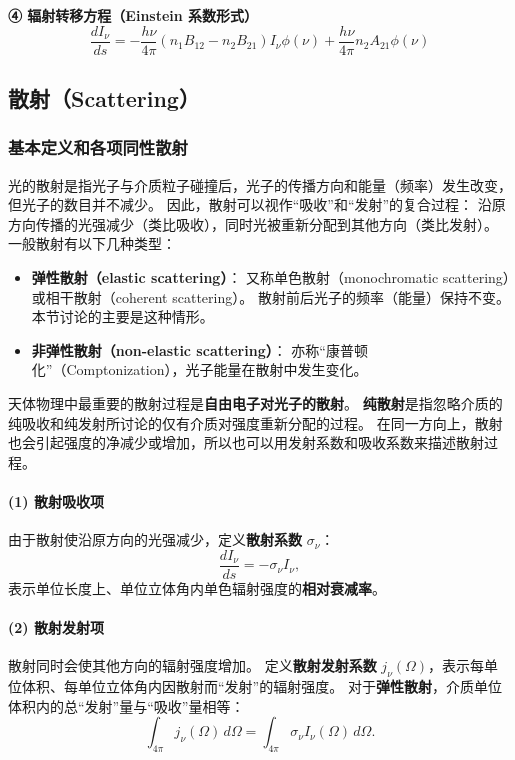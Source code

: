 \vspace{0.5em}
\noindent\textbf{④ 辐射转移方程（Einstein 系数形式）}
\[
\boxed{
\frac{dI_\nu}{ds}
= -\frac{h\nu}{4\pi}(n_1 B_{12} - n_2 B_{21}) I_\nu \phi(\nu)
+ \frac{h\nu}{4\pi} n_2 A_{21} \phi(\nu)
}
\]

\subsection{散射（Scattering）}
\subsubsection{基本定义和各项同性散射}
光的散射是指光子与介质粒子碰撞后，光子的传播方向和能量（频率）发生改变，
但光子的数目并不减少。  
因此，散射可以视作“吸收”和“发射”的复合过程：  
沿原方向传播的光强减少（类比吸收），同时光被重新分配到其他方向（类比发射）。
一般散射有以下几种类型：
\begin{itemize}
  \item \textbf{弹性散射（elastic scattering）}：  
    又称单色散射（monochromatic scattering）或相干散射（coherent scattering）。  
    散射前后光子的频率（能量）保持不变。  
    本节讨论的主要是这种情形。
  \item \textbf{非弹性散射（non-elastic scattering）}：  
    亦称“康普顿化”（Comptonization），光子能量在散射中发生变化。
\end{itemize}
天体物理中最重要的散射过程是\textbf{自由电子对光子的散射}。
\textbf{纯散射}是指忽略介质的纯吸收和纯发射所讨论的仅有介质对强度重新分配的过程。
在同一方向上，散射也会引起强度的净减少或增加，所以也可以用发射系数和吸收系数来描述散射过程。

\paragraph{(1) 散射吸收项}
由于散射使沿原方向的光强减少，定义\textbf{散射系数} $\sigma_\nu$：
\[
\frac{dI_\nu}{ds} = -\sigma_\nu I_\nu,
\]
表示单位长度上、单位立体角内单色辐射强度的\textbf{相对衰减率}。

\paragraph{(2) 散射发射项}
散射同时会使其他方向的辐射强度增加。  
定义\textbf{散射发射系数} $j_\nu(\Omega)$，表示每单位体积、每单位立体角内因散射而“发射”的辐射强度。
对于\textbf{弹性散射}，介质单位体积内的总“发射”量与“吸收”量相等：
\[
\int_{4\pi} j_\nu(\Omega)\, d\Omega
= \int_{4\pi} \sigma_\nu I_\nu(\Omega)\, d\Omega.
\]

